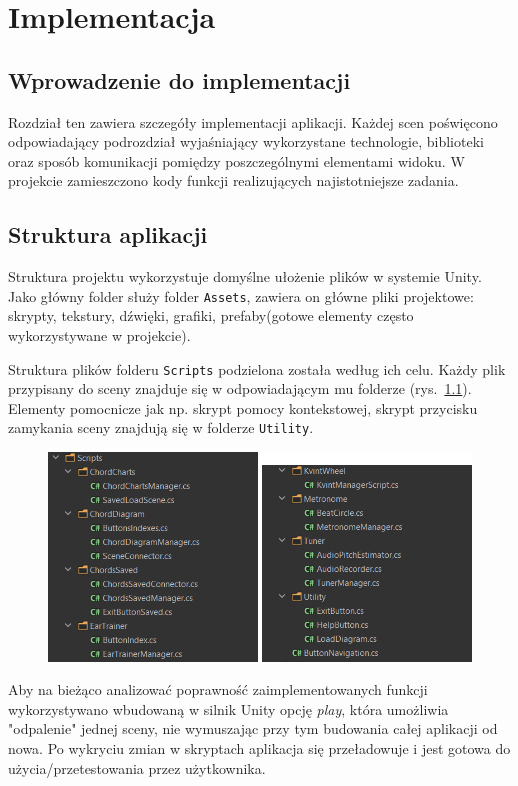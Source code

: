 \chapter{Implementacja}

\section{Wprowadzenie do implementacji}

Rozdział ten zawiera szczegóły implementacji aplikacji. Każdej scen poświęcono odpowiadający podrozdział wyjaśniający wykorzystane technologie, biblioteki oraz sposób komunikacji pomiędzy poszczególnymi elementami widoku. W projekcie zamieszczono kody funkcji realizujących najistotniejsze zadania.

\section{Struktura aplikacji}
Struktura projektu wykorzystuje domyślne ułożenie plików w systemie Unity. Jako główny folder służy folder \texttt{Assets}, zawiera on główne pliki projektowe: skrypty, tekstury, dźwięki, grafiki, prefaby(gotowe elementy często wykorzystywane w projekcie).

Struktura plików folderu \texttt{Scripts} podzielona została według ich celu. Każdy plik przypisany do sceny znajduje się w odpowiadającym mu folderze (rys.~\ref{fig:struktura}). Elementy pomocnicze jak np. skrypt pomocy kontekstowej, skrypt przycisku zamykania sceny znajdują się w folderze \texttt{Utility}.


\begin{figure}[htb]
    \centering
	\includegraphics[width=0.3\linewidth]{rys04/StrukturaPlikow}
    \label{fig:struktura}
\end{figure}

Aby na bieżąco analizować poprawność zaimplementowanych funkcji wykorzystywano wbudowaną w silnik Unity opcję \emph{play}, która umożliwia "odpalenie" jednej sceny, nie wymuszając przy tym budowania całej aplikacji od nowa. Po wykryciu zmian w skryptach aplikacja się przeładowuje i jest gotowa do użycia/przetestowania przez użytkownika.

